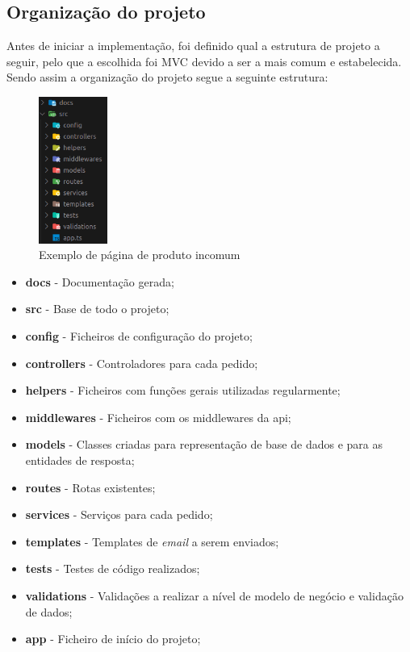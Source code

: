\subsection{Organização do projeto}
Antes de iniciar a implementação, foi definido qual a estrutura de projeto a seguir, pelo que a escolhida foi MVC devido a ser a mais comum e estabelecida. Sendo assim a organização do projeto segue a seguinte estrutura:
\begin{figure}[htb]
  \centering
  \includegraphics[width=0.2\textwidth]{images/implementacao/api/project_organization.png}
  \caption{Exemplo de página de produto incomum}
  \label{fig:63}
\end{figure}

\begin{itemize}
  \item \textbf{docs} - Documentação gerada;
  \item \textbf{src} - Base de todo o projeto;
  \item \textbf{config} - Ficheiros de configuração do projeto;
  \item \textbf{controllers} - Controladores para cada pedido;
  \item \textbf{helpers} - Ficheiros com funções gerais utilizadas regularmente;
  \item \textbf{middlewares} - Ficheiros com os middlewares da api;
  \item \textbf{models} - Classes criadas para representação de base de dados e para as entidades de resposta;
  \item \textbf{routes} - Rotas existentes;
  \item \textbf{services} - Serviços para cada pedido;
  \item \textbf{templates} - Templates de \textit{email} a serem enviados;
  \item \textbf{tests} - Testes de código realizados;
  \item \textbf{validations} - Validações a realizar a nível de modelo de negócio e validação de dados;
  \item \textbf{app} - Ficheiro de início do projeto;
\end{itemize}